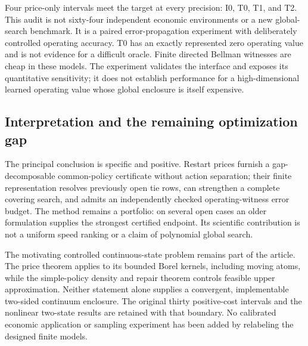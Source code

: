 Four price-only intervals meet the target at every precision: I0, T0, T1, and T2. This audit is not sixty-four independent economic environments or a new global-search benchmark. It is a paired error-propagation experiment with deliberately controlled operating accuracy. T0 has an exactly represented zero operating value and is not evidence for a difficult oracle. Finite directed Bellman witnesses are cheap in these models. The experiment validates the interface and exposes its quantitative sensitivity; it does not establish performance for a high-dimensional learned operating value whose global enclosure is itself expensive.

\subsection{Interpretation and the remaining optimization gap}
The principal conclusion is specific and positive. Restart prices furnish a gap-decomposable common-policy certificate without action separation; their finite representation resolves previously open tie rows, can strengthen a complete covering search, and admits an independently checked operating-witness error budget. The method remains a portfolio: on several open cases an older formulation supplies the strongest certified endpoint. Its scientific contribution is not a uniform speed ranking or a claim of polynomial global search.

The motivating controlled continuous-state problem remains part of the article. The price theorem applies to its bounded Borel kernels, including moving atoms, while the simple-policy density and repair theorem controls feasible upper approximation. Neither statement alone supplies a convergent, implementable two-sided continuum enclosure. The original thirty positive-cost intervals and the nonlinear two-state results are retained with that boundary. No calibrated economic application or sampling experiment has been added by relabeling the designed finite models.
